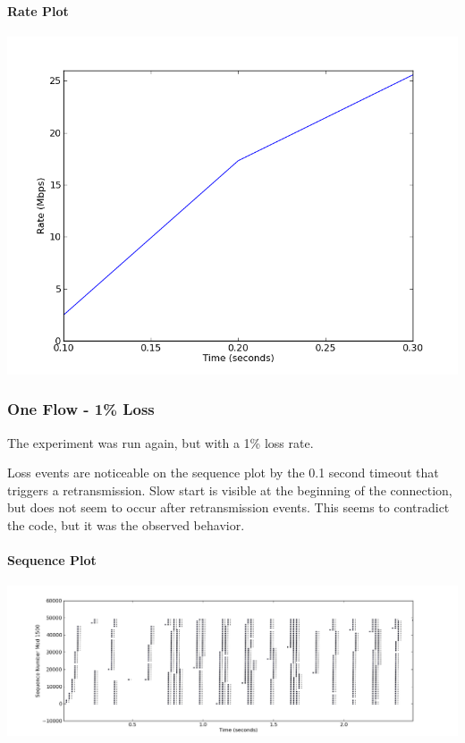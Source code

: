 \documentclass[11pt]{article}
\begin{document}
\paragraph{Rate Plot} \hspace{2mm}
\begin{center}
\includegraphics[width=15cm]{../plot/one_flow_0_loss/rate.png}
\end{center}

\subsubsection{One Flow - 1\% Loss}
The experiment was run again, but with a 1\% loss rate.

Loss events are noticeable on the sequence plot by the 0.1 second timeout that triggers a retransmission. Slow start is visible at the beginning of the connection, but does not seem to occur after retransmission events. This seems to contradict the code, but it was the observed behavior.

\paragraph{Sequence Plot} \hspace{2mm}
\begin{center}
\includegraphics[width=20cm]{../plot/one_flow_1_loss/sequence.png}
\end{center}
\end{document}
